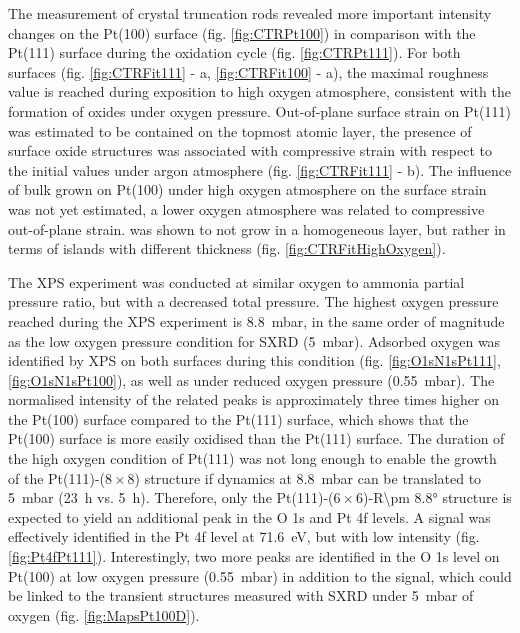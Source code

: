 The measurement of crystal truncation rods revealed more important intensity changes on the Pt(100) surface (fig. \ref{fig:CTRPt100}) in comparison with the Pt(111) surface during the oxidation cycle (fig. \ref{fig:CTRPt111}).
For both surfaces (fig. \ref{fig:CTRFit111} - a, \ref{fig:CTRFit100} - a), the maximal roughness value is reached during exposition to high oxygen atmosphere, consistent with the formation of oxides under oxygen pressure.
Out-of-plane surface strain on Pt(111) was estimated to be contained on the topmost atomic layer, the presence of surface oxide structures was associated with compressive strain with respect to the initial values under argon atmosphere (fig. \ref{fig:CTRFit111} - b).
The influence of bulk  grown on Pt(100) under high oxygen atmosphere on the surface strain was not yet estimated, a lower oxygen atmosphere was related to compressive out-of-plane strain.
 was shown to not grow in a homogeneous layer, but rather in terms of islands with different thickness (fig. \ref{fig:CTRFitHighOxygen}).

The XPS experiment was conducted at similar oxygen to ammonia partial pressure ratio, but with a decreased total pressure.
The highest oxygen pressure reached during the XPS experiment is \qty{8.8}{\milli\bar}, in the same order of magnitude as the low oxygen pressure condition for SXRD (\qty{5}{\milli\bar}).
Adsorbed oxygen was identified by XPS on both surfaces during this condition (fig. \ref{fig:O1sN1sPt111}, \ref{fig:O1sN1sPt100}), as well as under reduced oxygen pressure (\qty{0.55}{\milli\bar}).
The normalised intensity of the related peaks is approximately three times higher on the Pt(100) surface compared to the Pt(111) surface, which shows that the Pt(100) surface is more easily oxidised than the Pt(111) surface.
The duration of the high oxygen condition of Pt(111) was not long enough to enable the growth of the Pt(111)-($8\times8$) structure if dynamics at \qty{8.8}{\milli\bar} can be translated to \qty{5}{\milli\bar} (\qty{23}{\hour} vs. \qty{5}{\hour}).
Therefore, only the Pt(111)-($6\times6$)-R\ang{\pm 8.8} structure is expected to yield an additional peak in the O 1s and Pt 4f levels.
A signal was effectively identified in the Pt 4f level at \qty{71.6}{\eV}, but with low intensity (fig. \ref{fig:Pt4fPt111}).
Interestingly, two more peaks are identified in the O 1s level on Pt(100) at low oxygen pressure (\qty{0.55}{\milli\bar}) in addition to the  signal, which could be linked to the transient structures measured with SXRD under \qty{5}{\milli\bar} of oxygen (fig. \ref{fig:MapsPt100D}).

